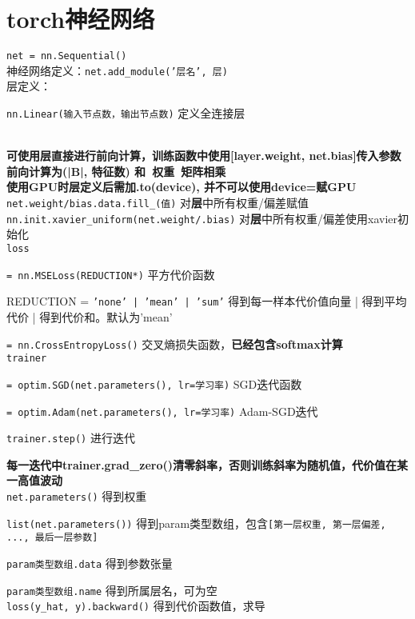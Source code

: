 \documentclass[UTF8]{ctexart}
\begin{document}
\section{torch神经网络}
\noindent \texttt{net = nn.Sequential()}\\
神经网络定义：\texttt{net.add\_module('层名', 层)}\\
层定义：

  \texttt{nn.Linear(输入节点数，输出节点数)} 定义全连接层

  \texttt{}\\
\textbf{可使用层直接进行前向计算，训练函数中使用[layer.weight, net.bias]传入参数}\\
\textbf{前向计算为(|B|, 特征数) 和\ 权重\ 矩阵相乘}\\
\textbf{使用GPU时层定义后需加.to(device), 并不可以使用device=赋GPU}\\
\texttt{net.weight/bias.data.fill\_(值)} 对\textbf{层}中所有权重/偏差赋值\\
\texttt{nn.init.xavier\_uniform(net.weight/.bias)} 对\textbf{层}中所有权重/偏差使用xavier初始化\\
\texttt{loss}

  \texttt{= nn.MSELoss(REDUCTION*)} 平方代价函数

  \quad REDUCTION = \texttt{'none' | 'mean' | 'sum'} 得到每一样本代价值向量 | 得到平均代价 | 得到代价和。默认为'mean'

  \texttt{= nn.CrossEntropyLoss()} 交叉熵损失函数，\textbf{已经包含softmax计算}\\
\texttt{trainer}

  \texttt{= optim.SGD(net.parameters(), lr=学习率)} SGD迭代函数

  \texttt{= optim.Adam(net.parameters(), lr=学习率)} Adam-SGD迭代

  \texttt{trainer.step()} 进行迭代
  
  \textbf{每一迭代中trainer.grad\_zero()清零斜率，否则训练斜率为随机值，代价值在某一高值波动}\\
\texttt{net.parameters()} 得到权重

  \texttt{list(net.parameters())} 得到param类型数组，包含\texttt{[第一层权重, 第一层偏差, ..., 最后一层参数]}
  
  \texttt{param类型数组.data} 得到参数张量
  
  \texttt{param类型数组.name} 得到所属层名，可为空\\
\texttt{loss(y\_hat, y).backward()} 得到代价函数值，求导
\end{document}
